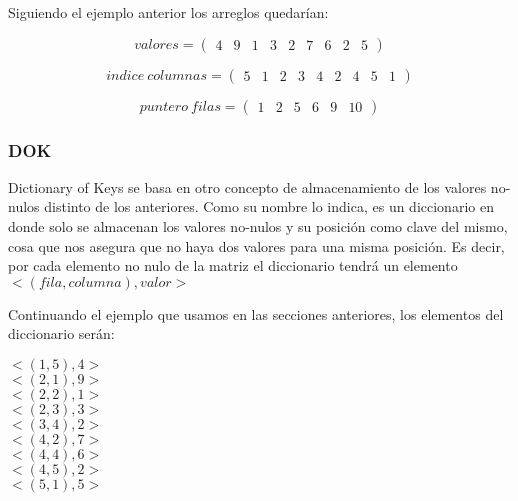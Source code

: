 Siguiendo el ejemplo anterior los arreglos quedarían:

\[ valores= \left( \begin{array}{ccccccccc}
4 & 9 & 1 & 3 & 2 & 7 & 6 & 2 & 5\end{array} 
\right)\] 

\[ indice\ columnas = \left( \begin{array}{ccccccccc}
5 & 1 & 2 & 3 & 4 & 2 & 4 & 5 & 1\end{array} 
\right)\] 

\[ puntero\ filas = \left( \begin{array}{cccccc}
1 & 2 & 5 & 6 & 9 & 10\end{array} 
\right)\] 

\subsubsection{DOK}
Dictionary of Keys se basa en otro concepto de almacenamiento de los valores no-nulos distinto de los anteriores. Como su nombre lo indica, es un diccionario en donde solo se almacenan los valores no-nulos y su posición como clave del mismo, cosa que nos asegura que no haya dos valores para una misma posición. Es decir, por cada elemento no nulo de la matriz el diccionario tendrá un elemento $<(fila, columna), valor>$

Continuando el ejemplo que usamos en las secciones anteriores, los elementos del diccionario serán:
\begin{center}

$<(1, 5), 4>$\\
$<(2, 1), 9>$\\
$<(2, 2), 1>$\\
$<(2, 3), 3>$\\
$<(3, 4), 2>$\\
$<(4, 2), 7>$\\
$<(4, 4), 6>$\\
$<(4, 5), 2>$\\
$<(5, 1), 5>$

\end{center}


